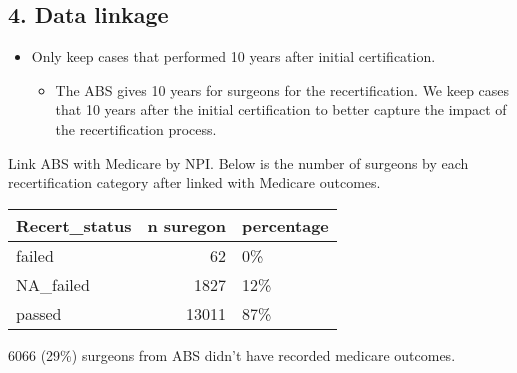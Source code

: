 \documentclass[
]{article}
\providecommand{\tightlist}{%
  \setlength{\itemsep}{0pt}\setlength{\parskip}{0pt}}
\begin{document}
\hypertarget{data-linkage}{%
\subsection{4. Data linkage}\label{data-linkage}}

\begin{itemize}
\tightlist
\item
  Only keep cases that performed 10 years after initial certification.

  \begin{itemize}
  \tightlist
  \item
    The ABS gives 10 years for surgeons for the recertification. We keep
    cases that 10 years after the initial certification to better
    capture the impact of the recertification process.
  \end{itemize}
\end{itemize}

Link ABS with Medicare by NPI. Below is the number of surgeons by each
recertification category after linked with Medicare outcomes.

\begin{table}[H]
\centering
\begin{tabular}{l|r|l}
\hline
Recert\_status & n suregon & percentage\\
\hline
failed & 62 & 0\%\\
\hline
NA\_failed & 1827 & 12\%\\
\hline
passed & 13011 & 87\%\\
\hline
\end{tabular}
\end{table}

6066 (29\%) surgeons from ABS didn't have recorded medicare outcomes.
\end{document}
